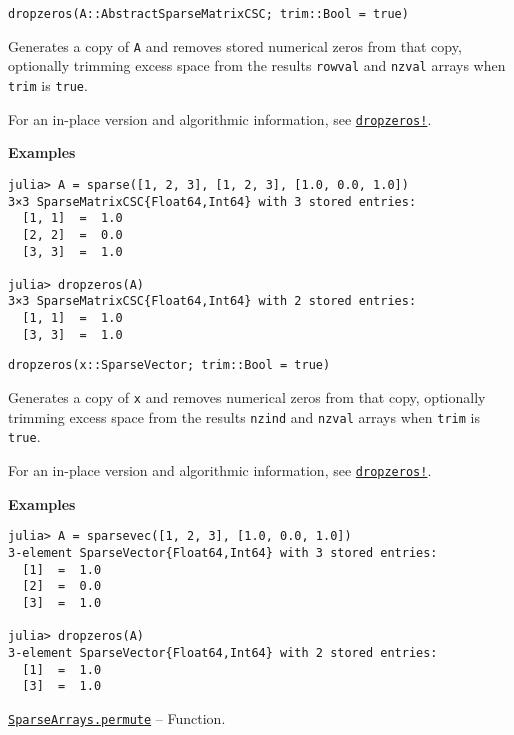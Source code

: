 \begin{adjustwidth}{2em}{0pt}


\begin{verbatim}
dropzeros(A::AbstractSparseMatrixCSC; trim::Bool = true)
\end{verbatim}

Generates a copy of \texttt{A} and removes stored numerical zeros from that copy, optionally trimming excess space from the result{\textquotesingle}s \texttt{rowval} and \texttt{nzval} arrays when \texttt{trim} is \texttt{true}.

For an in-place version and algorithmic information, see \hyperlink{13132808383029320263}{\texttt{dropzeros!}}.

\textbf{Examples}


\begin{verbatim}
julia> A = sparse([1, 2, 3], [1, 2, 3], [1.0, 0.0, 1.0])
3×3 SparseMatrixCSC{Float64,Int64} with 3 stored entries:
  [1, 1]  =  1.0
  [2, 2]  =  0.0
  [3, 3]  =  1.0

julia> dropzeros(A)
3×3 SparseMatrixCSC{Float64,Int64} with 2 stored entries:
  [1, 1]  =  1.0
  [3, 3]  =  1.0
\end{verbatim}




\begin{lstlisting}
dropzeros(x::SparseVector; trim::Bool = true)
\end{lstlisting}

Generates a copy of \texttt{x} and removes numerical zeros from that copy, optionally trimming excess space from the result{\textquotesingle}s \texttt{nzind} and \texttt{nzval} arrays when \texttt{trim} is \texttt{true}.

For an in-place version and algorithmic information, see \hyperlink{13132808383029320263}{\texttt{dropzeros!}}.

\textbf{Examples}


\begin{verbatim}
julia> A = sparsevec([1, 2, 3], [1.0, 0.0, 1.0])
3-element SparseVector{Float64,Int64} with 3 stored entries:
  [1]  =  1.0
  [2]  =  0.0
  [3]  =  1.0

julia> dropzeros(A)
3-element SparseVector{Float64,Int64} with 2 stored entries:
  [1]  =  1.0
  [3]  =  1.0
\end{verbatim}



\end{adjustwidth}
\hypertarget{12003442917636022234}{} 
\hyperlink{12003442917636022234}{\texttt{SparseArrays.permute}}  -- {Function.}

